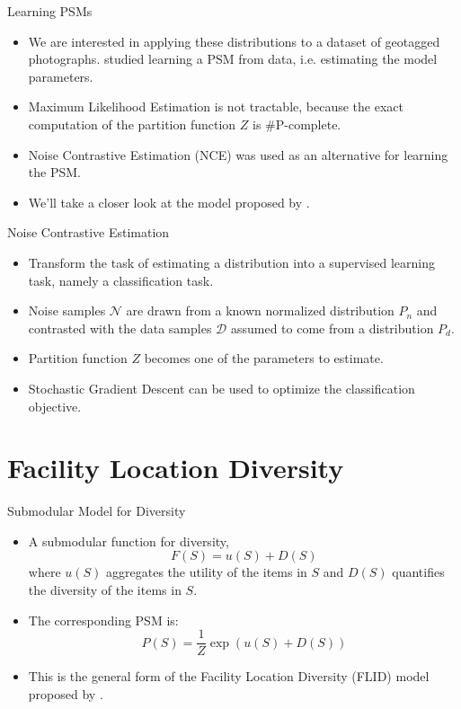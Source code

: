 \documentclass{beamer}
\begin{document}
\begin{frame}{Learning PSMs}
  \begin{itemize}
    \item We are interested in applying these distributions to a dataset of geotagged photographs. \citet{tschiatschek16learning} studied learning a PSM from data, i.e. estimating the model parameters.
    \item Maximum Likelihood Estimation is not tractable, because the exact computation of the partition function $Z$ is \#P-complete.
    \item Noise Contrastive Estimation (NCE) was used as an alternative for learning the PSM.
    \item We'll take a closer look at the model proposed by \citet{tschiatschek16learning}.
  \end{itemize}
\end{frame}

\begin{frame}{Noise Contrastive Estimation}
  \begin{itemize}
    \item Transform the task of estimating a distribution into a supervised learning task, namely a classification task.
    \item Noise samples $\mathcal{N}$ are drawn from a known normalized distribution $P_{n}$ and contrasted with the data samples $\mathcal{D}$ assumed to come from a distribution $P_{d}$.
    \item Partition function $Z$ becomes one of the parameters to estimate.
    \item Stochastic Gradient Descent can be used to optimize the classification objective.
  \end{itemize}
\end{frame}

\section{Facility Location Diversity}

\begin{frame}{Submodular Model for Diversity}
  \begin{itemize}
    \item A submodular function for diversity,
      \begin{equation*}
        F(S) = u(S) + D(S)
      \end{equation*}
    where $u(S)$ aggregates the utility of the items in $S$ and $D(S)$ quantifies the diversity of the items in $S$.
   \item The corresponding PSM is:
     \begin{equation*}
       P(S) = \frac{1}{Z}\exp{\left(u(S) + D(S)\right)}
     \end{equation*}
   \item This is the general form of the Facility Location Diversity (FLID) model proposed by \citet{tschiatschek16learning}.
  \end{itemize}
\end{frame}
\end{document}
